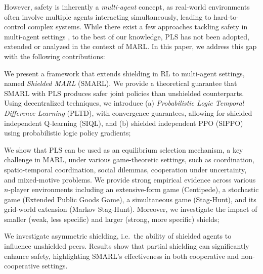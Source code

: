 \documentclass{ecai}
\theoremstyle{plain}
\theoremstyle{definition}
\theoremstyle{remark}
\begin{document}
However, safety is inherently a \textit{multi-agent} concept, as real-world environments often involve multiple agents interacting simultaneously, leading to hard-to-control complex systems. While there exist a few approaches tackling safety in multi-agent settings \citep{gu2023safe,elsayed2021safe,melcer2022shield, subramanian2024neuro}, to the best of our knowledge, PLS has not been adopted, extended or analyzed in the context of MARL. In this paper, we address this gap with the following contributions:
\begin{compactenum}
      \item We present a framework that extends shielding in RL to multi-agent settings, named \textit{Shielded MARL} (SMARL). We provide a theoretical guarantee that SMARL with PLS produces safer joint policies than unshielded counterparts. Using decentralized techniques, we introduce (a) \textit{Probabilistic Logic Temporal Difference Learning} (PLTD), with convergence guarantees, allowing for shielded independent Q-learning (SIQL), and (b) shielded independent PPO (SIPPO) using probabilistic logic policy gradients;
      \item We show that PLS can be used as an equilibrium selection mechanism, a key challenge in MARL, under various game-theoretic settings, such as coordination, spatio-temporal coordination, social dilemmas, cooperation under uncertainty, and mixed-motive problems. We provide strong empirical evidence across various $n$-player environments including an extensive-form game (Centipede), a stochastic game (Extended Public Goods Game), a simultaneous game (Stag-Hunt),  and its grid-world extension (Markov Stag-Hunt). Moreover, we investigate the impact of smaller (weak, less specific) and larger (strong, more specific) shields;
      \item We investigate asymmetric shielding, i.e.\ the ability of shielded agents to influence unshielded peers. Results show that partial shielding can significantly enhance safety, highlighting SMARL’s effectiveness in both cooperative and non-cooperative settings.
\end{compactenum}
\end{document}
